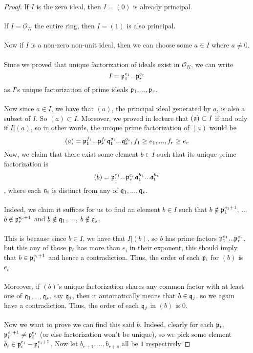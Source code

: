 \begin{proof}
If $I$ is the zero ideal, then $I = (0)$ is already principal.\\\\
If $I = \mathcal{O}_K$ the entire ring, then $I = (1)$ is also principal.\\\\ 
Now if $I$ is a non-zero non-unit ideal, then we can choose some $a \in I$ where $a \neq 0$.\\\\
Since we proved that unique factorization of ideals exist in $\mathcal{O}_K$, we can write
\[I = \mathfrak{p}_1^{e_1} ... \mathfrak{p}_r^{e_r}\]
as $I$'s unique factorization of prime ideals $\mathfrak{p}_1, ..., \mathfrak{p}_r$.\\\\
Now since $a \in I$, we have that $(a)$, the principal ideal generated by $a$, is also a subset of $I$. So $(a) \subset I$. Moreover, we proved in lecture that $(\mathfrak{a}) \subset I$ if and only if $I | (a)$, so in other words, the unique prime factorization of $(a)$ would be
\[(a) = \mathfrak{p}_1^{f_1} ... \mathfrak{p}_r^{f_r} \mathfrak{q}_1^{g_1} ... \mathfrak{q}_s^{g_s}, f_1 \geq e_1, ..., f_r \geq e_r\]
Now, we claim that there exist some element $b \in I$ such that its unique prime factorization is
\[(b) = \mathfrak{p}_1^{e_1} ... \mathfrak{p}_r^{e_r} \mathfrak{a}_1^{h_1} ... \mathfrak{a}_t^{h_t}\]
, where each $\mathfrak{a}_i$ is distinct from any of $\mathfrak{q}_1, ..., \mathfrak{q}_s$.\\\\
Indeed, we claim it suffices for us to find an element $b \in I$ such that $b \notin \mathfrak{p}_1^{e_1 + 1}$, ... $b \notin \mathfrak{p}_r^{e_r + 1}$ and $b \notin \mathfrak{q}_1$, ..., $b \notin \mathfrak{q}_s$.\\\\
This is because since $b \in I$, we have that $I | (b)$, so $b$ has prime factors $\mathfrak{p}_1^{e_1} ... \mathfrak{p}_r^{e_r}$, but this any of those $\mathfrak{p}_i$ has more than $e_i$ in their exponent, this should imply that $b \in \mathfrak{p}_i^{e_i + 1}$ and hence a contradiction. Thus, the order of each $\mathfrak{p}_i$ for $(b)$ is $e_i$.\\\\
Moreover, if $(b)$'s unique factorization shares any common factor with at least one of $\mathfrak{q}_1, ..., \mathfrak{q}_s$, say $\mathfrak{q}_j$, then it automatically means that $b \in \mathfrak{q}_j$, so we again have a contradiction. Thus, the order of each $\mathfrak{q}_j$ in $(b)$ is $0$.\\\\
Now we want to prove we can find this said $b$. Indeed, clearly for each $\mathfrak{p}_i$, $\mathfrak{p}_i^{e_i + 1} \neq \mathfrak{p}_i^{e_i}$ (or else factorization won't be unique), so we pick some element $b_i \in \mathfrak{p}_i^{e_i} - \mathfrak{p}_i^{e_i + 1}$. Now let $b_{r + 1}, ..., b_{r + s}$ all be $1$ respectively

\end{proof}
